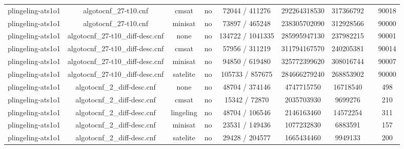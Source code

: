 \begin{appendices}
\begin{table}[p]
\begin{center}
\begin{tabular}{l|cccccccc}
  plingeling-ats1o1              & algotocnf\_27-t10.cnf          & cmsat      & no    & 72044 / 411276 & 292264318530 & 317366792 &            & 90018 \\ %
  plingeling-ats1o1              & algotocnf\_27-t10.cnf          & minisat    & no    & 73897 / 465248 & 238305702090 & 312928566 &            & 90000 \\ %
  plingeling-ats1o1              & algotocnf\_27-t10\_diff-desc.cnf & none       & no    & 134722 / 1041335 & 285995947130 & 237982215 &            & 90001 \\ %
  plingeling-ats1o1              & algotocnf\_27-t10\_diff-desc.cnf & cmsat      & no    & 57956 / 311219 & 311794167570 & 240205381 &            & 90014 \\ %
  plingeling-ats1o1              & algotocnf\_27-t10\_diff-desc.cnf & minisat    & no    & 94850 / 619480 & 325772399620 & 308016744 &            & 90007 \\ %
  plingeling-ats1o1              & algotocnf\_27-t10\_diff-desc.cnf & satelite   & no    & 105733 / 857675 & 284666279240 & 268853902 &            & 90000 \\ %
  plingeling-ats1o1              & algotocnf\_2\_diff-desc.cnf    & none       & no    & 48704 / 374146 & 4747715750 & 16718540  &            & 498 \\ %
  plingeling-ats1o1              & algotocnf\_2\_diff-desc.cnf    & cmsat      & no    & 15342 / 72870 & 2035703930 & 9699276   &            & 210 \\ %
  plingeling-ats1o1              & algotocnf\_2\_diff-desc.cnf    & lingeling  & no    & 48704 / 106546 & 2146163460 & 14572254  &            & 311 \\ %
  plingeling-ats1o1              & algotocnf\_2\_diff-desc.cnf    & minisat    & no    & 23531 / 149436 & 1077232830 & 6883591   &            & 157 \\ %
  plingeling-ats1o1              & algotocnf\_2\_diff-desc.cnf    & satelite   & no    & 29428 / 204577 & 1665434460 & 9949133   &            & 200 \\ %

\end{tabular}
\end{center}
\end{table}
\end{appendices}
